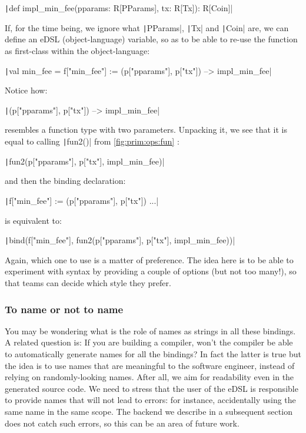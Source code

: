 \documentclass[11pt]{article}
\renewcommand{\vref}[1]{\autoref{#1} \vpageref{#1}}{}
\newcommand{\ScalaI}[1]{\texttt|#1|}
\begin{document}
\ScalaI{def impl_min_fee(pparams: R[PParams], tx: R[Tx]): R[Coin]}

\noindent If, for the time being, we ignore what \ScalaI{PParams}, 
\ScalaI{Tx} and \ScalaI{Coin} are, we can define an eDSL (object-language) 
variable, so as to be able to re-use the function as first-class within the 
object-language:

\ScalaI{val min_fee = f["min_fee"] := (p["pparams"], p["tx"]) --> impl_min_fee}

\noindent Notice how:

\ScalaI{(p["pparams"], p["tx"]) --> impl_min_fee}

\noindent resembles a function type with two parameters. Unpacking it, we see 
that it is equal to calling \ScalaI{fun2()} from \vref{fig:prim:ops:fun}:

\ScalaI{fun2(p["pparams"], p["tx"], impl_min_fee)}

\noindent and then the binding declaration:

\ScalaI{f["min_fee"] := (p["pparams"], p["tx"]) ...}

\noindent is equivalent to:

\ScalaI{bind(f["min_fee"], fun2(p["pparams"], p["tx"], impl_min_fee))}

\noindent Again, which one to use is a matter of preference. The idea here is 
to be able to experiment with syntax by providing a couple of options (but 
not too many!), so that teams can decide which style they prefer.

\subsubsection{To name or not to name}
You may be wondering what is the role of names as strings in all these 
bindings. A related question is: If you are building a compiler, won't the 
compiler be able to automatically generate names for all the bindings? In 
fact the latter is true but the idea is to use names that are meaningful to 
the software engineer, instead of relying on randomly-looking names. After 
all, we aim for readability even in the generated source code. We need to 
stress that the user of the eDSL is responsible to provide names that will 
not lead to errors: for instance, accidentally using the same name in the 
same scope. The backend we describe in a subsequent section does not catch 
such errors, so this can be an area of future work.
\end{document}
